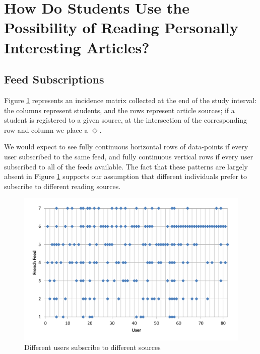 
\newpage
\section{How Do Students Use the Possibility of Reading Personally Interesting Articles?}
\label{sec:results}


\subsection {Feed Subscriptions}
Figure \ref{fig:subscriptions} represents an incidence matrix collected at the end of the study interval: the columns represent students, and the rows represent article sources; if a student is registered to a given source, at the intersection of the corresponding row and column we place a $\Diamond$. 

We would expect to see fully continuous horizontal rows of data-points if every user subscribed to the same feed, and fully continuous vertical rows if every user subscribed to all of the feeds available. The fact that these patterns are largely absent in Figure \ref{fig:subscriptions} supports our assumption that different individuals prefer to subscribe to different reading sources.


\begin{figure}[h!]

\centering
  \includegraphics[width=\columnwidth]{figures/users_feeds}
  \caption{Different users subscribe to different sources}
  \label{fig:subscriptions}  
\end{figure}

